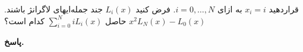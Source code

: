 قراردهید
\(x_i=i\)
به ازای  
\(i=0, \ldots, N\).
فرض کنید 
\(L_i(x)\)
جند جمله‌ایهای لاگرانژ باشند.
حاصل
\(\sum_{i=0}^{N} iL_i(x)\)
کدام است؟
\vspace*{-.3cm}
          {\(x^2\)}{\(L_N(x) - L_0(x)\)}

\begin{answer}

	\textbf{پاسخ.}
	
\end{answer}
